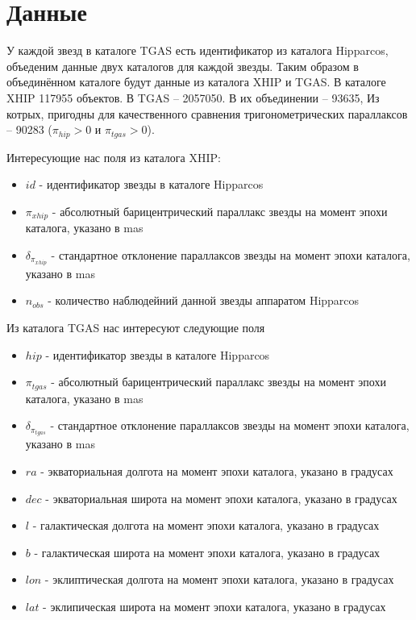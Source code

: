 \documentclass[14pt]{article} %
\begin{document}
\section{Данные}\label{sub:smthzd}
У каждой звезд в каталоге TGAS есть идентификатор из каталога Hipparcos, объеденим данные двух каталогов для каждой звезды. Таким образом в объединённом каталоге будут данные из каталога XHIP и TGAS. В каталоге XHIP 117955 объектов. В TGAS -- 2057050. В их объединении -- 93635, Из котрых, пригодны для качественного сравнения тригонометрических параллаксов -- 90283 ($\pi_{hip} > 0$ и $\pi_{tgas}>0$).


Интересующие нас поля из каталога XHIP:

\begin{itemize}

\item $id$ - идентификатор звезды в каталоге Hipparcos

\item $\pi_{xhip}$ - абсолютный барицентрический параллакс звезды на момент эпохи каталога, указано в mas

\item $\delta_{\pi_{xhip}}$ - стандартное отклонение параллаксов звезды на момент эпохи каталога, указано в mas

\item $n_{obs}$ - количество наблюдейний данной звезды аппаратом Hipparcos

\end{itemize}

Из каталога TGAS нас интересуют следующие поля

\begin{itemize}

\item $hip$ - идентификатор звезды в каталоге Hipparcos

\item $\pi_{tgas}$ - абсолютный барицентрический параллакс звезды на момент эпохи каталога, указано в mas

\item $\delta_{\pi_{tgas}}$ - стандартное отклонение параллаксов звезды на момент эпохи каталога, указано в mas

\item $ra$ - экваториальная долгота на момент эпохи каталога, указано в градусах

\item $dec$ - экваториальная широта на момент эпохи каталога, указано в градусах

\item $l$ - галактическая долгота на момент эпохи каталога, указано в градусах

\item $b$ - галактическая широта на момент эпохи каталога, указано в градусах

\item $lon$ - эклиптическая долгота на момент эпохи каталога, указано в градусах

\item $lat$ - эклипическая широта на момент эпохи каталога, указано в градусах

\end{itemize}
\end{document}
